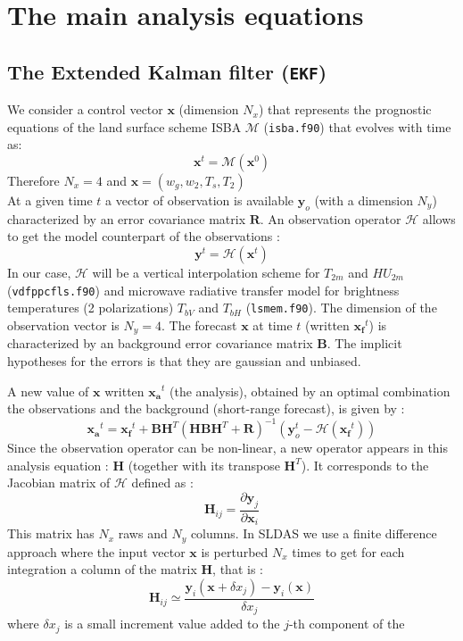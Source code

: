 \documentclass[12pt]{article}
\begin{document}
\section{The main analysis equations}
\subsection{The Extended Kalman filter ({\tt EKF})}
We consider a control vector $\mathbf{x}$ (dimension $N_x$)
that represents the prognostic equations of the land surface scheme ISBA  $\mathcal{M}$ 
({\tt isba.f90}) that
evolves with time as:
\[
\mathbf{x}^t = \mathcal{M}(\mathbf{x}^{0})
\]
Therefore $N_x=4$ and $\mathbf{x}=(w_g,w_2,T_s,T_2)$
\\
At a given time $t$ a vector of observation is available $\mathbf{y}_o$
(with a dimension $N_y$) characterized by an error covariance matrix
$\mathbf{R}$. An observation operator $\mathcal{H}$
allows to get the model counterpart of the observations :
\[
\mathbf{y}^t = \mathcal{H}(\mathbf{x}^t)
\]
In our case, $\mathcal{H}$ will be a vertical interpolation scheme for $T_{2m}$
and $HU_{2m}$ ({\tt vdfppcfls.f90}) and microwave radiative transfer model
for brightness temperatures (2 polarizations) $T_{bV}$ and $T_{bH}$ 
({\tt lsmem.f90}). The dimension of the observation vector is $N_y=4$.
The forecast $\mathbf{x}$ at time $t$ (written $\mathbf{x_f}^t$)
is characterized by an background error covariance matrix
$\mathbf{B}$. 
The implicit hypotheses for the errors is that they are gaussian and unbiased.
\par
A new value of $\mathbf{x}$ written $\mathbf{x_a}^t$
(the analysis), obtained by an optimal combination the
observations and the background (short-range forecast), is given by :
\[
\mathbf{x_a}^t = \mathbf{x_f}^t + \mathbf{B}\mathbf{H}^T(
 \mathbf{HBH}^T +  \mathbf{R})^{-1} (\mathbf{y}^t_o -
 \mathcal{H}(\mathbf{x_f}^t))
\]
Since the observation operator can be non-linear, a new
operator appears in this analysis equation : $\mathbf{H}$ (together
with its transpose $\mathbf{H}^T$).
It corresponds to the Jacobian matrix of $\mathcal{H}$
defined as :
\[
\mathbf{H}_{ij} = \frac{\partial \mathbf{y}_j}{\partial \mathbf{x}_i}
\]
This matrix has $N_x$ raws and  $N_y$ columns.
In SLDAS  we use a finite difference approach 
where the input vector $\mathbf{x}$ is perturbed $N_x$ times
to get for each integration a column of the matrix $\mathbf{H}$, that is :
\[
\mathbf{H}_{ij} \simeq \frac{\mathbf{y}_i(\mathbf{x}+\delta  {x}_j)-\mathbf{y}_i(\mathbf{x})}{{\delta x}_j}
\]
where $\delta x_j$ is a small increment value added to the $j$-th component of the
\end{document}
